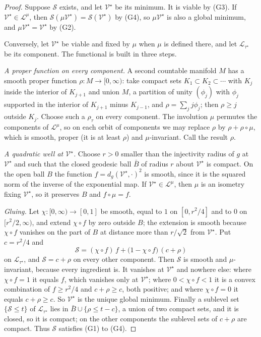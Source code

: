 \documentclass[11pt]{amsart}
\theoremstyle{definition}
\theoremstyle{remark}
\newcommand{\cL}{\mathcal{L}}
\newcommand{\cS}{\mathcal{S}}
\newcommand{\cV}{\mathcal{V}}
\begin{document}
\begin{proof}
Suppose $\cS$ exists, and let $\cV^\star$ be its minimum. It is viable by
(G3). If $\cV^\star\in\cL^\mu$, then $\cS(\mu\cV^\star)=\cS(\cV^\star)$ by
(G4), so $\mu\cV^\star$ is also a global minimum, and $\mu\cV^\star=
\cV^\star$ by (G2).

Conversely, let $\cV^\star$ be viable and fixed by $\mu$ when $\mu$ is
defined there, and let $\cL_{\tau^\star}$ be its component. The functional
is built in three steps.

\emph{A proper function on every component.} A second countable manifold
$M$ has a smooth proper function $\rho:M\to[0,\infty)$: take compact sets
$K_1\subset K_2\subset\cdots$ with $K_j$ inside the interior of $K_{j+1}$
and union $M$, a partition of unity $(\phi_j)$ with $\phi_j$ supported in
the interior of $K_{j+1}$ minus $K_{j-1}$, and $\rho=\sum_jj\phi_j$; then
$\rho\ge j$ outside $K_j$. Choose such a $\rho_\tau$ on every component. The
involution $\mu$ permutes the components of $\cL^\mu$, so on each orbit of
components we may replace $\rho$ by $\rho+\rho\circ\mu$, which is smooth,
proper (it is at least $\rho$) and $\mu$-invariant. Call the result $\rho$.

\emph{A quadratic well at $\cV^\star$.} Choose $r>0$ smaller than the
injectivity radius of $g$ at $\cV^\star$ and such that the closed geodesic
ball $\bar B$ of radius $r$ about $\cV^\star$ is compact. On the open ball
$B$ the function $f=d_g(\cV^\star,\cdot)^2$ is smooth, since it is the
squared norm of the inverse of the exponential map. If $\cV^\star\in
\cL^\mu$, then $\mu$ is an isometry fixing $\cV^\star$, so it preserves $B$
and $f\circ\mu=f$.

\emph{Gluing.} Let $\chi:[0,\infty)\to[0,1]$ be smooth, equal to $1$ on
$[0,r^2/4]$ and to $0$ on $[r^2/2,\infty)$, and extend $\chi\circ f$ by zero
outside $B$; the extension is smooth because $\chi\circ f$ vanishes on the
part of $B$ at distance more than $r/\sqrt2$ from $\cV^\star$. Put $c=r^2/4$
and
\[
\cS=(\chi\circ f)\,f+\big(1-\chi\circ f\big)\,(c+\rho)
\]
on $\cL_{\tau^\star}$, and $\cS=c+\rho$ on every other component. Then
$\cS$ is smooth and $\mu$-invariant, because every ingredient is. It
vanishes at $\cV^\star$ and nowhere else: where $\chi\circ f=1$ it equals
$f$, which vanishes only at $\cV^\star$; where $0<\chi\circ f<1$ it is a
convex combination of $f\ge r^2/4$ and $c+\rho\ge c$, both positive; and
where $\chi\circ f=0$ it equals $c+\rho\ge c$. So $\cV^\star$ is the unique
global minimum. Finally a sublevel set $\{\cS\le t\}$ of
$\cL_{\tau^\star}$ lies in $\bar B\cup\{\rho\le t-c\}$, a union of two
compact sets, and it is closed, so it is compact; on the other components
the sublevel sets of $c+\rho$ are compact. Thus $\cS$ satisfies (G1) to
(G4).
\end{proof}
\end{document}
